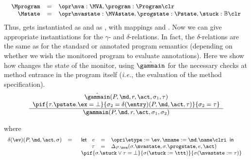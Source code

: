 \[
{\small
\begin{array}{rcl}
\Mprogram & =  & \opr \mva : \MVA, \program : \Program \clr\\
\Mstate & = & \opr \mvastate : \MVAstate, \progstate : \Pstate, \stuck
: \mathbb{B} \clr
\end{array}}
\]
Thus, \FullProgram gets instantiated as \Mprogram and \FullState as
\Mstate, with mappings \program and \progstate. Now we can give
appropriate instantiations for the \(\gamma\)- and
\(\delta\)-relations. In fact, the \(\delta\)-relations are the same as
for the standard or annotated program semantics (depending on whether
we wish the monitored program to evaluate annotations).
Here we show how \gammain changes the state
of the monitor, using \(\hat\gammain\) for the necessary checks at
method entrance in the program itself (\emph{i.e.}, the evaluation of
the method specification).
\[
{\small
\begin{array}{c}
\hat\gammain(P, \md, r, \act, \sigma_1, \tau) \\
\pif{\tau.\pstate.\ex = \bot}
    {\sigma_2 = \delta(\entry)(P, \md, \act, \tau)}
    {\sigma_2 = \tau}\\
\hline
\gammain(P, \md, r, \act, \sigma_1, \sigma_2)
\end{array}}
\]

\noindent where
\[
{\small
\begin{array}{rcl}
\delta(\ev)(P, \md, \act, \sigma) & = &
\begin{array}[t]{l}
\mathsf{let\ }
\begin{array}[t]{rcl}
  e & = & \opri \etype := \ev, \mname := \md.\name \clri\\
 \tau & = & \Delta_{P.\mva}(\sigma.\mvastate, \sigma.\progstate, e, \act)
\end{array}
\mathsf{in\ }\\
\pif{\sigma.\stuck \vee \tau = \bot}
    {\sigma (\stuck := \ttt)}
    {\sigma (\mvastate := \tau)}
\end{array}
\end{array}}
\]


